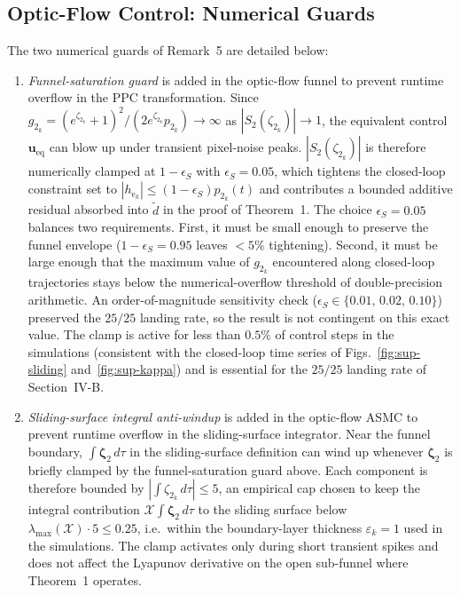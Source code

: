\documentclass[10pt,journal]{IEEEtran}
\begin{document}
\subsection{Optic-Flow Control: Numerical Guards}
\label{sup:optic_flow_remarks}
The two numerical guards of Remark~5 are detailed below:
\begin{enumerate}
    \item \emph{Funnel-saturation guard} is added in the optic-flow funnel to prevent runtime overflow in the PPC transformation.\label{sup:rmk_funnel_guard} Since $g_{2_k}=(e^{\zeta_{2_k}}+1)^2/(2e^{\zeta_{2_k}}p_{2_k})\to\infty$ as $|S_2(\zeta_{2_k})|\to 1$, the equivalent control $\boldsymbol{u}_\text{eq}$ can blow up under transient pixel-noise peaks. $|S_2(\zeta_{2_k})|$ is therefore numerically clamped at $1-\epsilon_S$ with $\epsilon_S=0.05$, which tightens the closed-loop constraint set to $|h_{\text{e}_k}|\le(1-\epsilon_S)p_{2_k}(t)$ and contributes a bounded additive residual absorbed into $\tilde{d}$ in the proof of Theorem~1. The choice $\epsilon_S=0.05$ balances two requirements. First, it must be small enough to preserve the funnel envelope ($1-\epsilon_S=0.95$ leaves $<\!5\%$ tightening). Second, it must be large enough that the maximum value of $g_{2_k}$ encountered along closed-loop trajectories stays below the numerical-overflow threshold of double-precision arithmetic. An order-of-magnitude sensitivity check ($\epsilon_S\in\{0.01,\,0.02,\,0.10\}$) preserved the $25/25$ landing rate, so the result is not contingent on this exact value. The clamp is active for less than $0.5\%$ of control steps in the simulations (consistent with the closed-loop time series of Figs.~\ref{fig:sup-sliding} and~\ref{fig:sup-kappa}) and is essential for the $25/25$ landing rate of Section~IV-B.
    \item \emph{Sliding-surface integral anti-windup} is added in the optic-flow ASMC to prevent runtime overflow in the sliding-surface integrator.\label{sup:rmk_anti_windup} Near the funnel boundary, $\int\boldsymbol{\zeta}_2\,d\tau$ in the sliding-surface definition can wind up whenever $\boldsymbol{\zeta}_2$ is briefly clamped by the funnel-saturation guard above. Each component is therefore bounded by $|\!\int\!\zeta_{2_k}\,d\tau|\le 5$, an empirical cap chosen to keep the integral contribution $\mathcal{X}\!\int\boldsymbol{\zeta}_2\,d\tau$ to the sliding surface below $\lambda_{\max}(\mathcal{X})\cdot 5\le 0.25$, i.e.\ within the boundary-layer thickness $\varepsilon_k=1$ used in the simulations. The clamp activates only during short transient spikes and does not affect the Lyapunov derivative on the open sub-funnel where Theorem~1 operates.
\end{enumerate}
\end{document}
